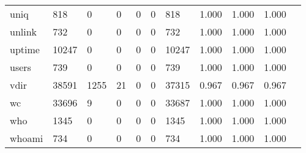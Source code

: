 \begin{longtable}{lp{1.10cm}p{1.10cm}p{1.10cm}p{1.10cm}p{1.10cm}p{1.10cm}p{1.10cm}p{1.10cm}p{1.10cm}p{1.10cm}}
uniq      &                    818 &                                  0 &                                 0 &                                0 &                                 0 &                             818 &                          1.000 &                                 1.000 &                               1.000 \\
unlink    &                    732 &                                  0 &                                 0 &                                0 &                                 0 &                             732 &                          1.000 &                                 1.000 &                               1.000 \\
uptime    &                  10247 &                                  0 &                                 0 &                                0 &                                 0 &                           10247 &                          1.000 &                                 1.000 &                               1.000 \\
users     &                    739 &                                  0 &                                 0 &                                0 &                                 0 &                             739 &                          1.000 &                                 1.000 &                               1.000 \\
vdir      &                  38591 &                               1255 &                                21 &                                0 &                                 0 &                           37315 &                          0.967 &                                 0.967 &                               0.967 \\
wc        &                  33696 &                                  9 &                                 0 &                                0 &                                 0 &                           33687 &                          1.000 &                                 1.000 &                               1.000 \\
who       &                   1345 &                                  0 &                                 0 &                                0 &                                 0 &                            1345 &                          1.000 &                                 1.000 &                               1.000 \\
whoami    &                    734 &                                  0 &                                 0 &                                0 &                                 0 &                             734 &                          1.000 &                                 1.000 &                               1.000 \\

\end{longtable}
